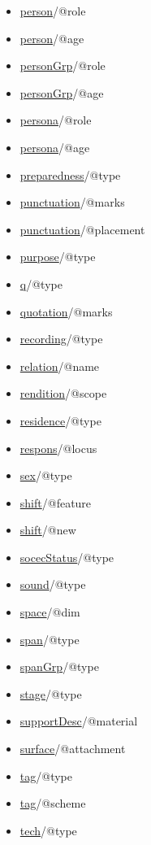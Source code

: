 \begin{reflist}
\begin{itemize}
\item \hyperref[TEI.person]{person}/@role
\item \hyperref[TEI.person]{person}/@age
\item \hyperref[TEI.personGrp]{personGrp}/@role
\item \hyperref[TEI.personGrp]{personGrp}/@age
\item \hyperref[TEI.persona]{persona}/@role
\item \hyperref[TEI.persona]{persona}/@age
\item \hyperref[TEI.preparedness]{preparedness}/@type
\item \hyperref[TEI.punctuation]{punctuation}/@marks
\item \hyperref[TEI.punctuation]{punctuation}/@placement
\item \hyperref[TEI.purpose]{purpose}/@type
\item \hyperref[TEI.q]{q}/@type
\item \hyperref[TEI.quotation]{quotation}/@marks
\item \hyperref[TEI.recording]{recording}/@type
\item \hyperref[TEI.relation]{relation}/@name
\item \hyperref[TEI.rendition]{rendition}/@scope
\item \hyperref[TEI.residence]{residence}/@type
\item \hyperref[TEI.respons]{respons}/@locus
\item \hyperref[TEI.sex]{sex}/@type
\item \hyperref[TEI.shift]{shift}/@feature
\item \hyperref[TEI.shift]{shift}/@new
\item \hyperref[TEI.socecStatus]{socecStatus}/@type
\item \hyperref[TEI.sound]{sound}/@type
\item \hyperref[TEI.space]{space}/@dim
\item \hyperref[TEI.span]{span}/@type
\item \hyperref[TEI.spanGrp]{spanGrp}/@type
\item \hyperref[TEI.stage]{stage}/@type
\item \hyperref[TEI.supportDesc]{supportDesc}/@material
\item \hyperref[TEI.surface]{surface}/@attachment
\item \hyperref[TEI.tag]{tag}/@type
\item \hyperref[TEI.tag]{tag}/@scheme
\item \hyperref[TEI.tech]{tech}/@type

\end{itemize}
\end{reflist}
